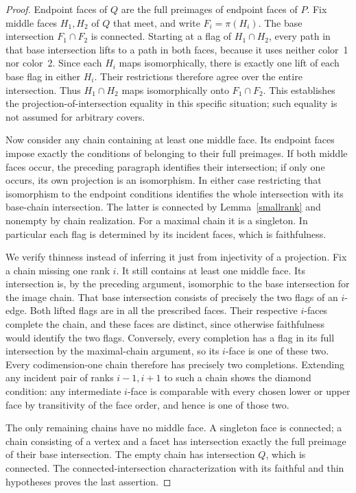 \documentclass[a4paper,11pt]{article}
\begin{document}
\begin{proof}
Endpoint faces of $Q$ are the full preimages of endpoint faces of $P$.
Fix middle faces $H_1,H_2$ of $Q$ that meet, and write $F_i=\pi(H_i)$.
The base intersection $F_1\cap F_2$ is connected. Starting at a flag
of $H_1\cap H_2$, every path in that base intersection lifts to a path
in both faces, because it uses neither color~1 nor color~2. Since each
$H_i$ maps isomorphically, there is exactly one lift of each base flag
in either $H_i$. Their restrictions therefore agree over the entire
intersection. Thus $H_1\cap H_2$ maps isomorphically onto $F_1\cap F_2$.
This establishes the projection-of-intersection equality in this
specific situation; such equality is not assumed for arbitrary covers.

Now consider any chain containing at least one middle face. Its endpoint
faces impose exactly the conditions of belonging to their full preimages.
If both middle faces occur, the preceding paragraph identifies their
intersection; if only one occurs, its own projection is an isomorphism.
In either case restricting that isomorphism to the endpoint conditions
identifies the whole intersection with its base-chain intersection.
The latter is connected by Lemma~\ref{smallrank} and nonempty by chain realization. For a
maximal chain it is a singleton. In particular each flag is determined
by its incident faces, which is faithfulness.

We verify thinness instead of inferring it just from injectivity of a
projection. Fix a chain missing one rank $i$. It still contains at least
one middle face. Its intersection is, by the preceding argument,
isomorphic to the base intersection for the image chain. That base
intersection consists of precisely the two flags of an $i$-edge.
Both lifted flags are in all the prescribed faces. Their respective
$i$-faces complete the chain, and these faces are distinct, since
otherwise faithfulness would identify the two flags. Conversely, every
completion has a flag in its full intersection by the maximal-chain
argument, so its $i$-face is one of these two. Every codimension-one chain
therefore has precisely two completions. Extending any incident pair
of ranks $i-1,i+1$ to such a chain shows the diamond condition: any
intermediate $i$-face is comparable with every chosen lower or upper
face by transitivity of the face order, and hence is one of those two.

The only remaining chains have no middle face. A singleton face is
connected; a chain consisting of a vertex and a facet has intersection
exactly the full preimage of their base intersection. The empty chain
has intersection $Q$, which is connected. The connected-intersection characterization with its faithful and thin
hypotheses proves the last assertion.
\end{proof}
\end{document}
